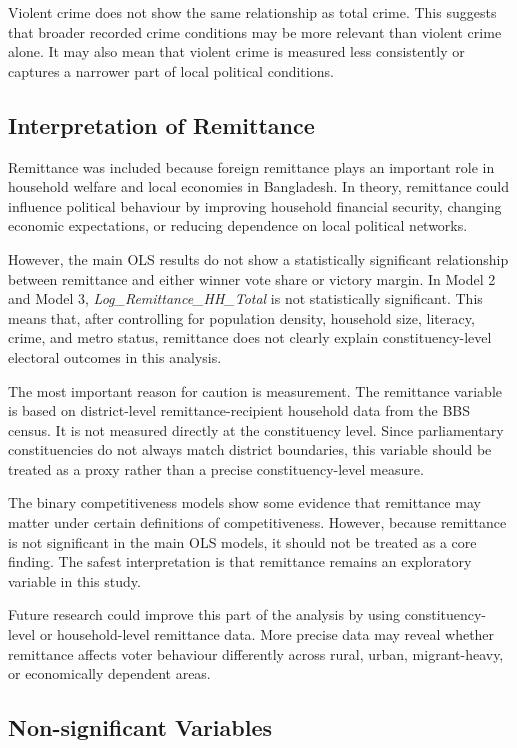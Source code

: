 \documentclass[12pt,a4paper]{article}
\begin{document}
Violent crime does not show the same relationship as total crime. This suggests that broader recorded crime conditions may be more relevant than violent crime alone. It may also mean that violent crime is measured less consistently or captures a narrower part of local political conditions.

\subsection{Interpretation of Remittance}

Remittance was included because foreign remittance plays an important role in household welfare and local economies in Bangladesh. In theory, remittance could influence political behaviour by improving household financial security, changing economic expectations, or reducing dependence on local political networks.

However, the main OLS results do not show a statistically significant relationship between remittance and either winner vote share or victory margin. In Model 2 and Model 3, \textit{Log\_Remittance\_HH\_Total} is not statistically significant. This means that, after controlling for population density, household size, literacy, crime, and metro status, remittance does not clearly explain constituency-level electoral outcomes in this analysis.

The most important reason for caution is measurement. The remittance variable is based on district-level remittance-recipient household data from the BBS census. It is not measured directly at the constituency level. Since parliamentary constituencies do not always match district boundaries, this variable should be treated as a proxy rather than a precise constituency-level measure.

The binary competitiveness models show some evidence that remittance may matter under certain definitions of competitiveness. However, because remittance is not significant in the main OLS models, it should not be treated as a core finding. The safest interpretation is that remittance remains an exploratory variable in this study.

Future research could improve this part of the analysis by using constituency-level or household-level remittance data. More precise data may reveal whether remittance affects voter behaviour differently across rural, urban, migrant-heavy, or economically dependent areas.

\subsection{Non-significant Variables}
\end{document}
